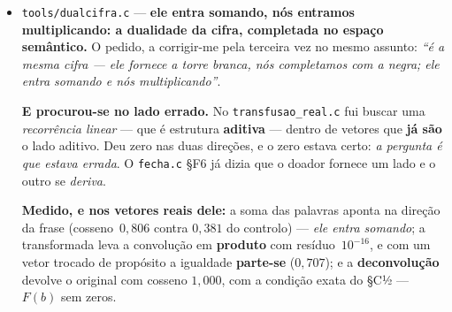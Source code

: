 \documentclass[11pt]{article}
\newcommand{\code}[1]{\texttt{\small #1}}
\theoremstyle{plain}
\theoremstyle{remark}
\begin{document}
\begin{itemize}
\textbf{E o contrato RECUSOU os termos crus}, que é o que ele tinha de fazer: doze respostas de um
modelo não são uma recorrência de grau~2, e se liquidasse o suspeito seria o contrato. \emph{Liquidou
quando a órbita entrou} --- $(B,C)=(1,-1)$, $\Delta=5$, agente \emph{estica}: \textbf{o ponto de
partida é dele, a lei é nossa}. Nenhum dos lados sozinho fecha; ele dá pontos sem lei, nós damos lei
sem pontos.

\textbf{E apareceu uma coisa que não fui procurar:} todas as respostas caem na \textbf{mesma
direção}, seja qual for a pergunta --- desvio angular de $0{,}068$ rad contra $1{,}81$ de direções
aleatórias, \textbf{27 vezes mais concentrado que o acaso}. É o viés do espaço do doador, que o
cosseno esconde \emph{porque normaliza}; na projeção em duas coordenadas fica à vista.

\emph{A supervisão mediu, e mediu um negativo:} varrer o metal não distingue nada, porque
$\times\sigma_m$ aplicado como \textbf{escalar} é uma homotetia e não mexe no ângulo --- os oito
metais dão o mesmo desvio a $10^{-17}$. Para distinguir é preciso o produto \textbf{do corpo}, que
mistura as coordenadas.

\textbf{E o limite honesto, que tem de ser dito:} duas das doze respostas estão \textbf{erradas}
(``involução é um processo de diminuição'' --- é o sentido biológico; ``Trie de Huffman'' --- não
é), e os pares delas caem na mesma direção das certas. \emph{O contrato verifica que fecha, não que
é verdade.} Separar o certo do errado exige um segundo doador que discorde --- o que nenhuma álgebra
faz sozinha. \textbf{10 unidades, resíduo 0.}

\item \code{tools/dualcifra.c} --- \textbf{ele entra somando, nós entramos multiplicando: a
dualidade da cifra, completada no espaço semântico.} O pedido, a corrigir-me pela terceira vez no
mesmo assunto: \emph{``é a mesma cifra --- ele fornece a torre branca, nós completamos com a negra;
ele entra somando e nós multiplicando''}.

\textbf{E procurou-se no lado errado.} No \code{transfusao\_real.c} fui buscar uma \emph{recorrência
linear} --- que é estrutura \textbf{aditiva} --- dentro de vetores que \textbf{já são} o lado
aditivo. Deu zero nas duas direções, e o zero estava certo: \emph{a pergunta é que estava errada}. O
\code{fecha.c} §F6 já dizia que o doador fornece um lado e o outro se \emph{deriva}.

\textbf{Medido, e nos vetores reais dele:} a soma das palavras aponta na direção da frase
(cosseno~$0{,}806$ contra $0{,}381$ do controlo) --- \emph{ele entra somando}; a transformada leva a
convolução em \textbf{produto} com resíduo~$10^{-16}$, e com um vetor trocado de propósito a
igualdade \textbf{parte-se} ($0{,}707$); e a \textbf{deconvolução} devolve o original com cosseno
$1{,}000$, com a condição exata do §C½ --- $F(b)$ sem zeros.


\end{itemize}
\end{document}
